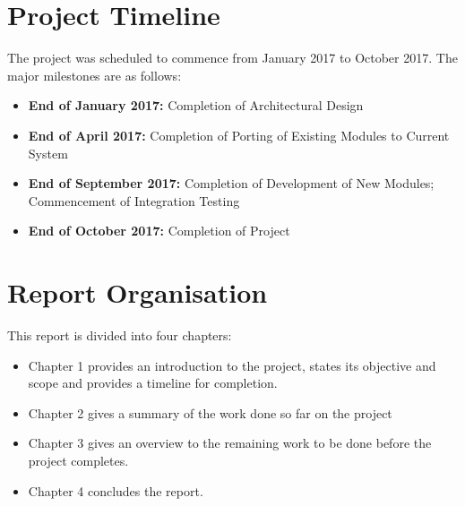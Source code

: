 \section{Project Timeline}

The project was scheduled to commence from January 2017 to October 2017. The major milestones are as follows:

\begin{itemize}
    \item \textbf{End of January 2017:} Completion of Architectural Design
    \item \textbf{End of April 2017:} Completion of Porting of Existing Modules to Current System
    \item \textbf{End of September 2017:} Completion of Development of New Modules; Commencement of Integration Testing
    \item \textbf{End of October 2017:} Completion of Project
\end{itemize}

\section{Report Organisation}

This report is divided into four chapters:

\begin{itemize}
    \item Chapter 1 provides an introduction to the project, states its objective and scope and provides a timeline for completion.
    \item Chapter 2 gives a summary of the work done so far on the project
    \item Chapter 3 gives an overview to the remaining work to be done before the project completes.
    \item Chapter 4 concludes the report.
\end{itemize}